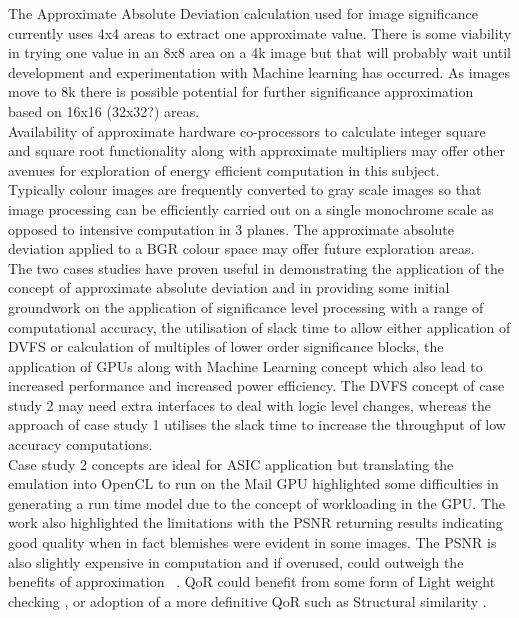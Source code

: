 \documentclass[journal]{IEEEtran}
\begin{document}
The Approximate Absolute Deviation calculation used for image significance currently uses 4x4 areas to extract one approximate value. There is some viability in trying one value in an 8x8 area on a 4k image but that will probably wait until development and experimentation with Machine learning has occurred. As images move to 8k there is possible potential for further significance approximation based on 16x16 (32x32?) areas. \\
Availability of approximate hardware co-processors to calculate integer square and square root functionality along with approximate multipliers may offer other avenues for exploration of energy efficient computation in this subject.\\
Typically colour images are frequently converted to gray scale images so that image processing can be efficiently carried out on a single monochrome scale as opposed to intensive computation in 3 planes. The approximate absolute deviation applied to a BGR colour space may offer future exploration areas.\\
The two cases studies have proven useful in demonstrating the application of the concept of approximate absolute deviation and in providing some initial groundwork on the application of significance level processing with a range of computational accuracy, the utilisation of slack time to allow either application of DVFS or calculation of multiples of lower order significance blocks, the application of GPUs  along with Machine Learning concept which also lead to increased performance and increased power efficiency. The DVFS concept of case study 2 may need extra interfaces to deal with logic level changes, whereas the approach of case study 1 utilises the slack time to increase the throughput  of low accuracy computations. \\
Case study 2 concepts are ideal for ASIC application but translating the emulation into OpenCL to run on the Mail GPU highlighted some difficulties in generating a run time model due to the concept of workloading in the GPU. The work also highlighted the limitations with the PSNR returning results indicating good quality when in fact blemishes were evident in some images. The PSNR is also slightly expensive in computation and if overused, could outweigh the benefits of approximation ~\cite{Xu2016}. QoR could benefit from some form of Light weight checking \cite{Grigorian2014,Wang2002}, or adoption of a more definitive QoR such as Structural similarity \cite{Wang2004}.
\end{document}
